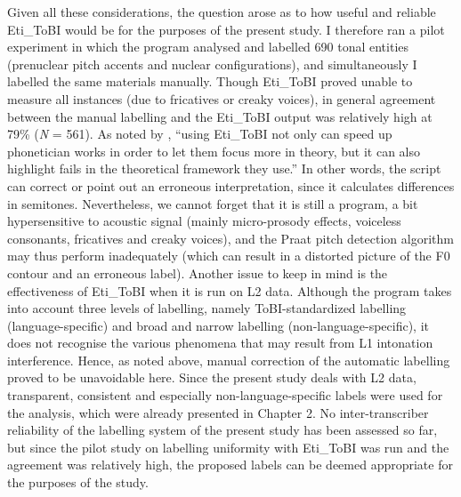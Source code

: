 Given all these considerations, the question arose as to how useful and reliable Eti\_ToBI would be for the purposes of the present study. I therefore ran a pilot experiment in which the program analysed and labelled 690 tonal entities (prenuclear pitch accents and nuclear configurations), and simultaneously I labelled the same materials manually. Though Eti\_ToBI proved unable to measure all instances (due to fricatives or creaky voices), in general agreement between the manual labelling and the Eti\_ToBI output was relatively high at 79\% (\textit{N} = 561). As noted by \citet[6]{Elvira-García2016}, “using Eti\_ToBI not only can speed up phonetician works in order to let them focus more in theory, but it can also highlight fails in the theoretical framework they use.” In other words, the script can correct or point out an erroneous interpretation, since it calculates differences in semitones. Nevertheless, we cannot forget that it is still a program, a bit hypersensitive to acoustic signal (mainly micro-prosody effects, voiceless consonants, fricatives and creaky voices), and the Praat pitch detection algorithm may thus perform inadequately (which can result in a distorted picture of the F0 contour and an erroneous label). Another issue to keep in mind is the effectiveness of Eti\_ToBI when it is run on L2 data. Although the program takes into account three levels of labelling, namely ToBI-standardized labelling (language-specific) and broad and narrow labelling (non-language-specific), it does not recognise the various phenomena that may result from L1 intonation interference. Hence, as noted above, manual correction of the automatic labelling proved to be unavoidable here. Since the present study deals with L2 data, transparent, consistent and especially non-language-specific labels were used for the analysis, which were already presented in Chapter 2. No inter-transcriber reliability of the labelling system of the present study has been assessed so far, but since the pilot study on labelling uniformity with Eti\_ToBI was run and the agreement was relatively high, the proposed labels can be deemed appropriate for the purposes of the study.



